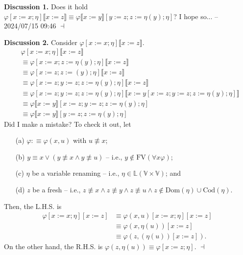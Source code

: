 \documentclass[12pt]{paper}
\newenvironment{context}[1][]
{ \noindent \textbf{{#1}.} }
{ \hfill $ \dashv $ }
\begin{document}
\begin{context}[Discussion 1]
Does it hold $\varphi \left[ x := x ; \eta \right] \llbracket x := z \rrbracket \equiv \varphi \llbracket x := y \rrbracket \left[ y := z ; z := \eta \left( y \right) ; \eta \right]$? \newline
I hope so... -- 2024/07/15 09:46 
\end{context}

\newpage

\begin{context}[Discussion 2]
Consider $\varphi \left[ x := x ; \eta \right] \llbracket x := z \rrbracket$.
\begin{align*}
& \varphi \left[ x := x ; \eta \right] \llbracket x := z \rrbracket \\
& \equiv \varphi \left[ x := x ; z := \eta \left( y \right) ; \eta \right] \llbracket x := z \rrbracket \\
& \equiv \varphi \left[ x := z ; z := \left( y \right) ; \eta \right] \llbracket x := z \rrbracket \\
& \equiv \varphi \left[ x := z ; y := z ; z := \eta \left( y \right) ; \eta \right] \llbracket x := z \rrbracket \\
& \equiv \varphi \left[ x := z ; y := z ; z := \eta \left( y \right) ; \eta \right] \llbracket x := y \left[ x := z ; y := z ; z := \eta \left( y \right) ; \eta \right] \rrbracket \\
& \equiv \varphi \llbracket x := y \rrbracket \left[ x := z ; y := z ; z := \eta \left( y \right) ; \eta \right] \\
& \equiv \varphi \llbracket x := y \rrbracket \left[ y := z ; z := \eta \left( y \right) ; \eta \right]
\end{align*}
Did I make a mistake? To check it out, let
\begin{enumerate}
\item [(a)] $ \varphi : \equiv \varphi \left( x , u \right)$ with $ u \not\equiv x $;
\item [(b)] $ y \equiv x \lor \left( y \not\equiv x \land y \not\equiv u \right) $ -- i.e., $ y \notin \mathrm{FV} \left( \forall x \varphi \right) $;
\item [(c)] $\eta$ be a variable renaming -- i.e., $ \eta \in \mathbb{L} \left( \mathbb{V} \times \mathbb{V} \right) $; and
\item [(d)] $z$ be a fresh -- i.e., $z \not\equiv x \land z \not\equiv y \land z \not\equiv u \land z \notin \mathrm{Dom} \left( \eta \right) \cup \mathrm{Cod} \left( \eta \right)$.
\end{enumerate}
Then, the L.H.S. is
\begin{align*}
\varphi \left[ x := x ; \eta \right] \left[ x := z \right]
& \equiv \varphi \left( x , u \right) \left[ x := x ; \eta \right] \left[ x := z \right] \\
& \equiv \varphi \left( x , \eta \left( u \right) \right) \left[ x := z \right] \\
& \equiv \varphi \left( z , \left( \eta \left( u \right) \right) \left[ x := z \right] \right) .
\end{align*}
On the other hand, the R.H.S. is $\varphi \left( z , \eta \left( u \right) \right) \equiv \varphi \left[ x := z ; \eta \right]$.
\end{context}
\end{document}
